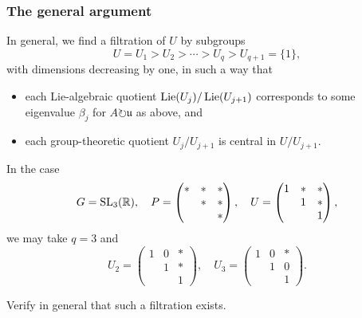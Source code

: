 \documentclass[reqno]{amsart} 
\begin{document}
\subsubsection{The general argument}
In general, we find a filtration of $U$ by subgroups
\begin{equation*}
  U = U_1 > U_2 > \dotsb > U_q > U_{q+1} = \{1\},
\end{equation*}
with dimensions decreasing by one, in such a way that
\begin{itemize}
\item each Lie-algebraic quotient $\operatorname{Lie}(U_j) / \operatorname{Lie}(U_{j+1})$ corresponds to some eigenvalue $\beta_j$ for $A \circlearrowright \mathfrak{u}$ as above, and
\item each group-theoretic quotient $U_j / U_{j+1}$ is central in $U / U_{j+1}$.
\end{itemize}
\begin{example}\label{exa:case--g}
  In the case
  \begin{equation*}
    G = \operatorname{SL}_3(\mathbb{R}), \quad
    P = 
    \begin{pmatrix}
      \ast & \ast & \ast \\
           & \ast & \ast \\
           &  & \ast
    \end{pmatrix}
    ,
    \quad
    U = 
    \begin{pmatrix}
      1 & \ast & \ast \\
        & 1 & \ast \\
        &  & 1
    \end{pmatrix}
    ,
  \end{equation*}
  we may take $q = 3$ and
  \begin{equation*}
    U_2 = 
    \begin{pmatrix}
      1 & 0 & \ast \\
        & 1 & \ast \\
        &  & 1
    \end{pmatrix}
    ,
    \quad
    U_3 = 
    \begin{pmatrix}
      1 & 0 & \ast \\
        & 1 & 0 \\
        &  & 1
    \end{pmatrix}
    .
  \end{equation*}
\end{example}
\begin{exercise}
  Verify in general that such a filtration exists.
\end{exercise}
\end{document}
